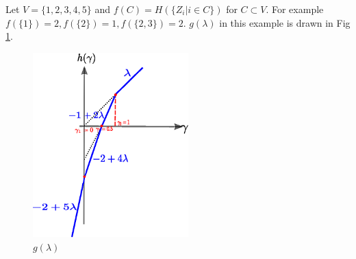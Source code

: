 \documentclass{article}
\begin{document}
Let $V=\{1,2,3,4,5\}$ and $f(C) = H(\{Z_i |  i \in C \})$ for $C\subset V$.
For example $f(\{1\}) = 2, f(\{2\})=1, f(\{2,3\})=2$.
$g(\lambda)$ in this example is drawn in Fig \ref{fig:gLambda}.
\begin{figure}[!ht]
\includegraphics[width=6cm]{pic/dt2.eps}
\caption{$g(\lambda)$}\label{fig:gLambda}
\end{figure}
\end{document}
